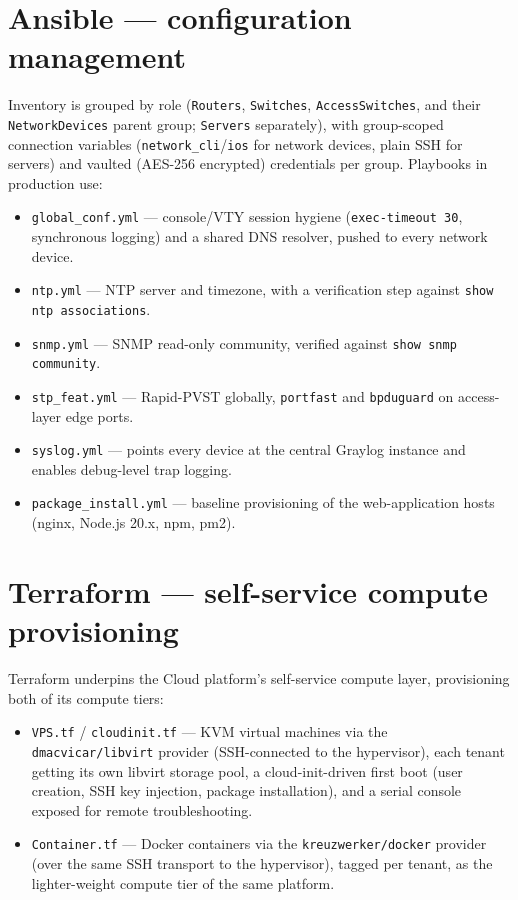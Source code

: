 \documentclass[11pt,a4paper]{report}
\begin{document}
\section{Ansible --- configuration management}

Inventory is grouped by role (\texttt{Routers}, \texttt{Switches},
\texttt{AccessSwitches}, and their \texttt{NetworkDevices} parent group;
\texttt{Servers} separately), with group-scoped connection variables
(\texttt{network\_cli}/\texttt{ios} for network devices, plain SSH for
servers) and vaulted (AES-256 encrypted) credentials per group. Playbooks
in production use:

\begin{itemize}[leftmargin=1.5em]
  \item \texttt{global\_conf.yml} --- console/VTY session hygiene
    (\texttt{exec-timeout 30}, synchronous logging) and a shared DNS
    resolver, pushed to every network device.
  \item \texttt{ntp.yml} --- NTP server and timezone, with a verification
    step against \texttt{show ntp associations}.
  \item \texttt{snmp.yml} --- SNMP read-only community, verified against
    \texttt{show snmp community}.
  \item \texttt{stp\_feat.yml} --- Rapid-PVST globally, \texttt{portfast}
    and \texttt{bpduguard} on access-layer edge ports.
  \item \texttt{syslog.yml} --- points every device at the central Graylog
    instance and enables debug-level trap logging.
  \item \texttt{package\_install.yml} --- baseline provisioning of the
    web-application hosts (nginx, Node.js 20.x, npm, pm2).
\end{itemize}

\section{Terraform --- self-service compute provisioning}

Terraform underpins the Cloud platform's self-service compute layer,
provisioning both of its compute tiers:

\begin{itemize}[leftmargin=1.5em]
  \item \texttt{VPS.tf} / \texttt{cloudinit.tf} --- KVM virtual machines
    via the \texttt{dmacvicar/libvirt} provider (SSH-connected to the
    hypervisor), each tenant getting its own libvirt storage pool, a
    cloud-init-driven first boot (user creation, SSH key injection,
    package installation), and a serial console exposed for remote
    troubleshooting.
  \item \texttt{Container.tf} --- Docker containers via the
    \texttt{kreuzwerker/docker} provider (over the same SSH transport to
    the hypervisor), tagged per tenant, as the lighter-weight compute tier
    of the same platform.
\end{itemize}
\end{document}
